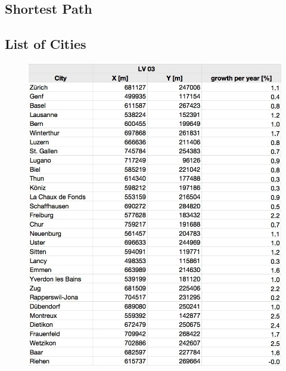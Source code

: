 \documentclass[11pt]{scrartcl}
\begin{document}


\null
\null

\subsection{Shortest Path}
\label{sec:shortest_path}



\subsection{List of Cities}
\begin{figure}[H]
	\centering
	\includegraphics[width=1.0\textwidth]{figures/city_list1}
\end{figure}
\end{document}

